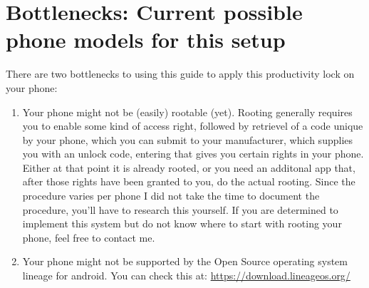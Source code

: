 \section{Bottlenecks: Current possible phone models for this setup}
There are two bottlenecks to using this guide to apply this productivity lock on your phone:
\begin{enumerate}
    \item Your phone might not be (easily) rootable (yet). Rooting generally requires you to enable some kind of access right, followed by retrievel of a code unique by your phone, which you can submit to your manufacturer, which supplies you with an unlock code, entering that gives you certain rights in your phone. Either at that point it is already rooted, or you need an additonal app that, after those rights have been granted to you, do the actual rooting. Since the procedure varies per phone I did not take the time to document the procedure, you'll have to research this yourself. If you are determined to implement this system but do not know where to start with rooting your phone, feel free to contact me.
    \item Your phone might not be supported by the Open Source operating system lineage for android. You can check this at: \url{https://download.lineageos.org/}
\end{enumerate}